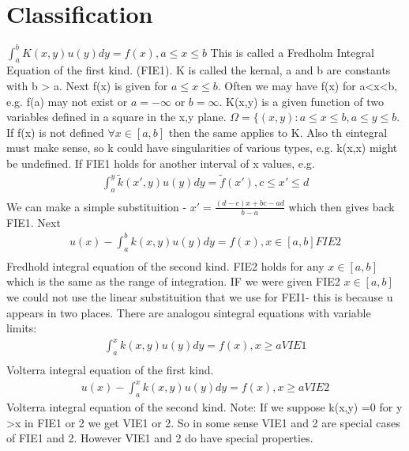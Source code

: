 \documentclass[10pt, oneside]{article}
\begin{document}
\section{Classification}
$\int_{a}^{b}K(x,y)u(y)dy = f(x) , a \leq x \leq b$ This is called a Fredholm Integral Equation of the first kind. (FIE1). 
K is called the kernal, a and b are constants with b > a. Next f(x) is given for $a \leq x \leq b$. Often we may have f(x) for a<x<b, e.g. f(a) may not exist or $a = -\infty$ or $b = \infty$. K(x,y) is a given function of two variables defined in a square in the x,y plane. 
$\Omega = \{(x,y):a\leq x \leq b, a \leq y \leq b$. If f(x) is not defined $\forall  x \in [a,b]$ then the same applies to K.
Also th eintegral must make sense, so k could have singularities of various types, e.g. k(x,x) might be undefined. If FIE1 holds for another interval of x values, e.g.
\begin{align*}
    \int_{a}^{y} \tilde{k}(x',y)u(y)dy = \tilde{f}(x'), c \leq x' \leq d \\
\end{align*}
We can make a simple substituition - $x' =\frac{(d-c)x+bc-ad}{b-a}$
which then gives back FIE1. Next
\begin{align*}
    u(x) - \int_{a}^{b}k(x,y)u(y)dy = f(x) , x \in [a,b] FIE2 \\
\end{align*}
Fredhold integral equation of the second kind. 
FIE2 holds for any $x \in [a,b]$ which is the same as the range of integration. IF we were given FIE2 $x \in [a,b]$ we could not use the linear substituition that we use for FEI1- this is because u appears in two places.
There are analogou sintegral equations with variable limits:
\begin{align*}
    \int_{a}^{x}k(x,y)u(y)dy = f(x), x \geq a VIE1 \\
\end{align*}
Volterra integral equation of the first kind. 
\begin{align*}
    u(x) - \int_{a}^{x}k(x,y)u(y)dy =f(x), x \geq a VIE2
\end{align*}
Volterra integral equation of the second kind. 
Note: If we suppose k(x,y) =0 for y >x in FIE1 or 2 we get VIE1 or 2. So in some sense VIE1 and 2 are special cases of FIE1 and 2. However VIE1 and 2 do have special properties.  
\end{document}
